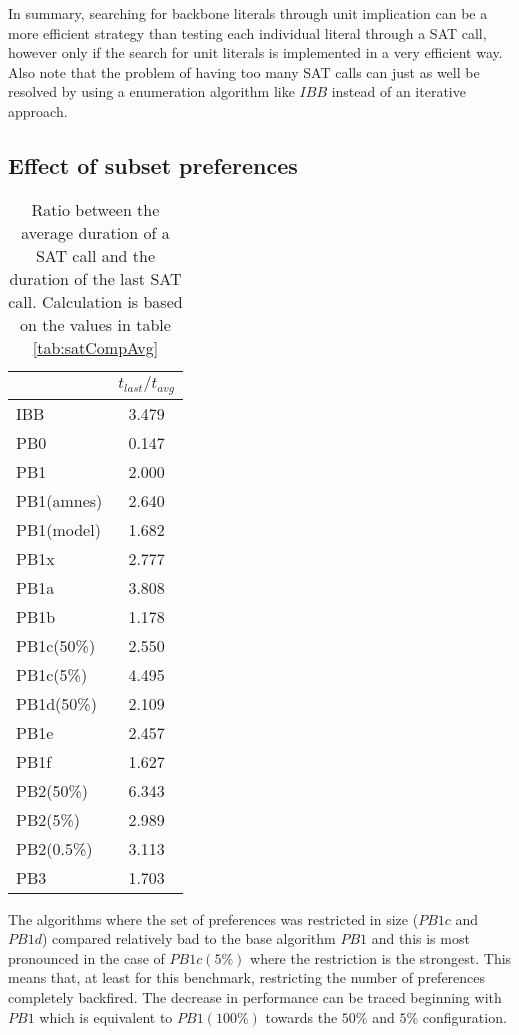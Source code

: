 In summary, searching for backbone literals through unit implication can be a more efficient strategy than testing each individual literal through a SAT call, however only if the search for unit literals is implemented in a very efficient way. Also note that the problem of having too many SAT calls can just as well be resolved by using a enumeration algorithm like $IBB$ instead of an iterative approach.

\subsection{Effect of subset preferences}

\begin{wraptable}{r}{5cm} %
\begin{tabular}{l| c }
 & $t_{last}/t_{avg}$  \\
\hline
IBB & 3.479 \\
PB0 & 0.147 \\
PB1 & 2.000 \\
PB1(amnes) & 2.640 \\
PB1(model) & 1.682 \\
PB1x & 2.777 \\
PB1a & 3.808 \\
PB1b & 1.178 \\
PB1c(50\%) & 2.550 \\
PB1c(5\%) & 4.495 \\
PB1d(50\%) & 2.109 \\
PB1e & 2.457 \\
PB1f & 1.627 \\
PB2(50\%) & 6.343 \\
PB2(5\%) & 2.989 \\
PB2(0.5\%) & 3.113 \\
PB3 & 1.703 \\
\end{tabular}
\caption{Ratio between the average duration of a SAT call and the duration of the last SAT call. Calculation is based on the values in table \ref{tab:satCompAvg}}
\label{tab:lastTimeToAvgTime}
\end{wraptable}

The algorithms where the set of preferences was restricted in size ($PB1c$ and $PB1d$) compared relatively bad to the base algorithm $PB1$ and this is most pronounced in the case of $PB1c(5\%)$ where the restriction is the strongest. This means that, at least for this benchmark, restricting the number of preferences completely backfired. The decrease in performance can be traced beginning with $PB1$ which is equivalent to $PB1(100\%)$ towards the $50\%$ and $5\%$ configuration.

